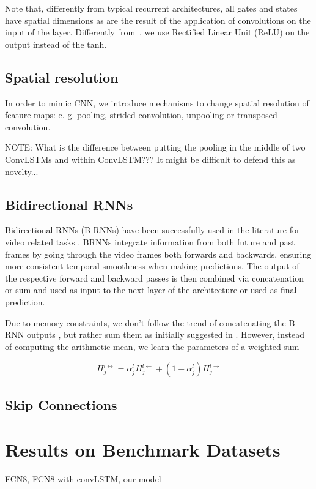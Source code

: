 Note that, differently from typical recurrent architectures, all gates and
states have spatial dimensions as are the result of the application of
convolutions on the input of the layer. Differently from~\cite{ShiCWYWW15}, we
use Rectified Linear Unit (ReLU) on the output instead of the tanh.

\subsection{Spatial resolution}
In order to mimic CNN, we introduce mechanisms to change spatial resolution of
feature maps: e. g. pooling, strided convolution, unpooling or transposed
convolution.

NOTE: What is the difference between putting the pooling in the middle of two
ConvLSTMs and within ConvLSTM??? It might be difficult to defend this as
novelty...

\subsection{Bidirectional RNNs}
Bidirectional RNNs (B-RNNs) \cite{Schuster1997bidirecrnn} have been
successfully used in the literature for video related tasks \cite{Du2015_CVPR}.
BRNNs integrate information from both future and past frames by going through
the video frames both forwards and backwards, ensuring more consistent temporal
smoothness when making predictions. The output of the respective forward and
backward passes is then combined via concatenation or sum and used as input to
the next layer of the architecture or used as final prediction.

Due to memory constraints, we don't follow the trend of concatenating the B-RNN
outputs \cite{}, but rather sum them as initially  suggested in
\cite{Schuster1997bidirecrnn}. However, instead of computing the arithmetic
mean, we learn the parameters of a weighted sum

\[ H_j^{l\leftrightarrow} = \alpha_j^{l} H_j^{l\leftarrow} + (1 - \alpha_j^{l}) H_j^{l\rightarrow}\]

\subsection{Skip Connections}

\section{Results on Benchmark Datasets}
\label{sec:exp}
FCN8, FCN8 with convLSTM, our model
